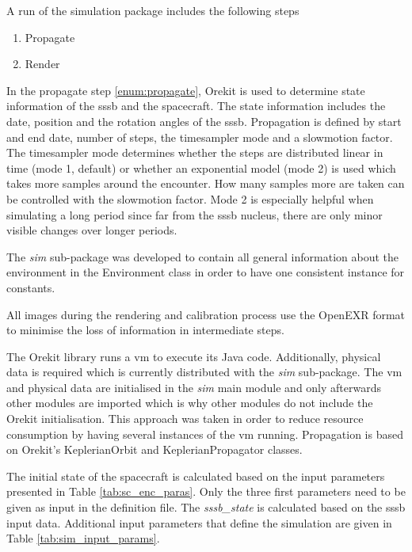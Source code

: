 A run of the simulation package includes the following steps
\begin{enumerate}
    \item Propagate \label{enum:propagate}
    \item Render
\end{enumerate}

In the propagate step \ref{enum:propagate}, Orekit is used to determine state information of the \gls{sssb} and the spacecraft. The state information includes the date, position and the rotation angles of the \gls{sssb}. Propagation is defined by start and end date, number of steps, the timesampler mode and a slowmotion factor.
The timesampler mode determines whether the steps are distributed linear in time (mode 1, default) or whether an exponential model (mode 2) is used which takes more samples around the encounter. How many samples more are taken can be controlled with the slowmotion factor. Mode 2 is especially helpful when simulating a long period since far from the \gls{sssb} nucleus, there are only minor visible changes over longer periods.

The \textit{sim} sub-package was developed to contain all general information about the environment in the Environment class in order to have one consistent instance for constants. 

All images during the rendering and calibration process use the OpenEXR format to minimise the loss of information in intermediate steps.

The Orekit library runs a \gls{vm} to execute its Java code. Additionally, physical data is required which is currently distributed with the \textit{sim} sub-package. The \gls{vm} and physical data are initialised in the \textit{sim} main module and only afterwards other modules are imported which is why other modules do not include the Orekit initialisation. This approach was taken in order to reduce resource consumption by having several instances of the \gls{vm} running. Propagation is based on Orekit's KeplerianOrbit and KeplerianPropagator classes.

The initial state of the spacecraft is calculated based on the input parameters presented in Table \ref{tab:sc_enc_paras}. Only the three first parameters need to be given as input in the definition file. The \textit{sssb\_state} is calculated based on the \gls{sssb} input data. Additional input parameters that define the simulation are given in Table \ref{tab:sim_input_params}.

